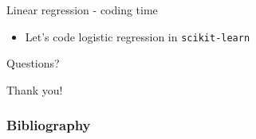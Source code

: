 \documentclass[aspectratio=169]{beamer}
\begin{document}
\begin{frame}{Linear regression - coding time}
    \begin{itemize}
        \item Let's code logistic regression in \texttt{scikit-learn}
    \end{itemize}
\end{frame}
\begin{frame}
\Huge{\centerline{Questions?}}
\end{frame}
\begin{frame}
\Huge{\centerline{Thank you!}}
\end{frame}


\begin{frame}[t, allowframebreaks]
\frametitle{Bibliography}


\end{frame}
\end{document}
